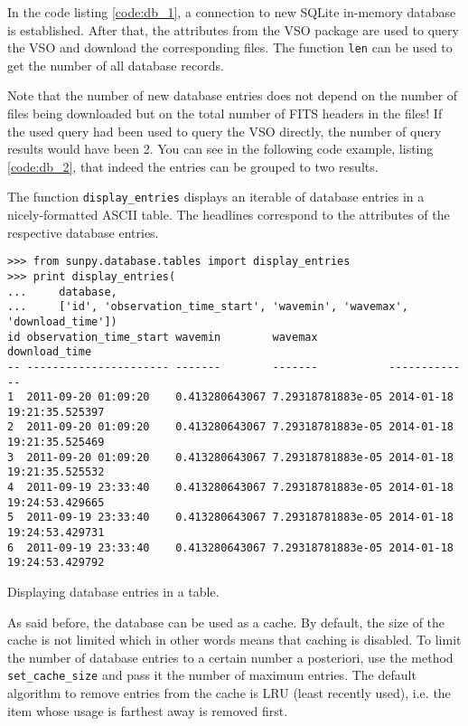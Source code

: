 In the code listing \ref{code:db_1}, a connection to new SQLite in-memory
database is established. After that, the attributes from the \textsc{VSO}
package are used to query the \textsc{VSO} and download the corresponding
files. The function \texttt{len} can be used to get the number of all database
records.

Note that the number of new database entries does not depend on the
number of files being downloaded but on the total number of \textsc{FITS}
headers in the files! If the used query had been used to query the \textsc{VSO}
directly, the number of query results would have been 2. You can see in the
following code example, listing \ref{code:db_2}, that indeed the entries can
be grouped to two results.

The function \texttt{display\_entries} displays an iterable of database entries
in a nicely-formatted \textsc{ASCII} table. The headlines correspond to the
attributes of the respective database entries.

\begin{listing}[H]
\begin{verbatim}
>>> from sunpy.database.tables import display_entries
>>> print display_entries(
...     database,
...     ['id', 'observation_time_start', 'wavemin', 'wavemax', 'download_time'])
id observation_time_start wavemin        wavemax           download_time             
-- ---------------------- -------        -------           -------------             
1  2011-09-20 01:09:20    0.413280643067 7.29318781883e-05 2014-01-18 19:21:35.525397
2  2011-09-20 01:09:20    0.413280643067 7.29318781883e-05 2014-01-18 19:21:35.525469
3  2011-09-20 01:09:20    0.413280643067 7.29318781883e-05 2014-01-18 19:21:35.525532
4  2011-09-19 23:33:40    0.413280643067 7.29318781883e-05 2014-01-18 19:24:53.429665
5  2011-09-19 23:33:40    0.413280643067 7.29318781883e-05 2014-01-18 19:24:53.429731
6  2011-09-19 23:33:40    0.413280643067 7.29318781883e-05 2014-01-18 19:24:53.429792
\end{verbatim}
\caption{Displaying database entries in a table.}
\label{code:db_2}
\end{listing}

As said before, the database can be used as a cache. By default, the size of
the cache is not limited which in other words means that caching is disabled.
To limit the number of database entries to a certain number a posteriori, use
the method \texttt{set\_cache\_size} and pass it the number of maximum entries.
The default algorithm to remove entries from the cache is \textsc{LRU}
(least recently used), i.e. the item whose usage is farthest away is removed
first.  %

